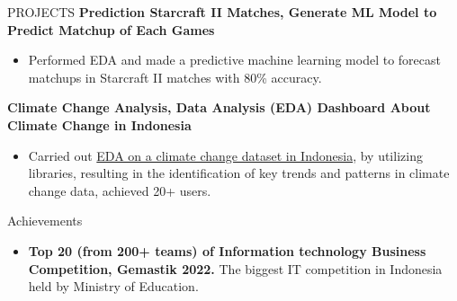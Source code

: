 \documentclass{resume} %
\begin{document}
\begin{rSection}{PROJECTS}
{\bf Prediction Starcraft II Matches, Generate ML Model to Predict Matchup of Each Games}
\vspace{-0.75em}
\begin{itemize}
\itemsep -7pt {}
\item Performed EDA and made a predictive machine learning model to forecast matchups in Starcraft II matches with 80\% accuracy.
 \end{itemize}
 \vspace{-0.5em}

{\bf Climate Change Analysis, Data Analysis (EDA) Dashboard About Climate Change in Indonesia}
\vspace{-0.75em}
\begin{itemize}
\itemsep -7pt {}
\item Carried out \href{https://nafisazizir-tetrisprogram-dashboard-eup8c6.streamlit.app/}{EDA on a climate change dataset in Indonesia}, by utilizing libraries, resulting in the identification of key trends and patterns in climate change data, achieved 20+ users.
 \end{itemize}
 \vspace{-0.5em}


\end{rSection} 

\begin{rSection}{Achievements}

\begin{itemize}
\itemsep -7pt {}
\item \textbf{Top 20 (from 200+ teams) of Information technology Business Competition, Gemastik 2022.} The biggest IT competition in Indonesia held by Ministry of Education.
 \end{itemize}
 \vspace{-0.5em}


\end{rSection}
\end{document}
